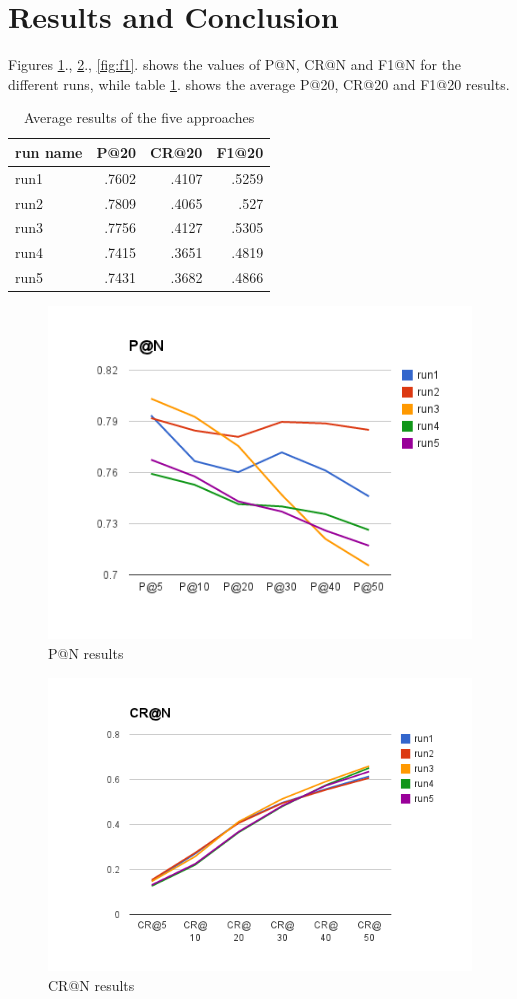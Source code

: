 \documentclass{acm_proc_article-me}
\begin{document}
\section{Results and Conclusion}

Figures \ref{fig:p}., \ref{fig:cr}., \ref{fig:f1}. shows the values of P@N, CR@N and F1@N for the different runs, while table \ref{table:results}. shows the average P@20, CR@20 and F1@20 results.



\begin{table}[h]
\centering
\begin{tabular}{|l|r|r|r|}
	\hline 
	run name & P@20 & CR@20 & F1@20\tabularnewline
	\hline 
	\hline 
	run1 & .7602 & .4107 & .5259\tabularnewline
	\hline 
	run2 & .7809 & .4065 & .527\tabularnewline
	\hline 
	run3 & .7756 & .4127 & .5305\tabularnewline
	\hline 
	run4 & .7415 & .3651 & .4819\tabularnewline
	\hline 
	run5 & .7431 & .3682 & .4866\tabularnewline
	\hline 
\end{tabular}
\caption{Average results of the five approaches}
\label{table:results}
\end{table}

\begin{figure}[h]
\includegraphics[width=0.9\linewidth]{p}
\caption{P@N results}
\label{fig:p}
\end{figure}

\begin{figure}[h]
\includegraphics[width=0.9\linewidth]{cr}
\caption{CR@N results}
\label{fig:cr}
\end{figure}
\end{document}
